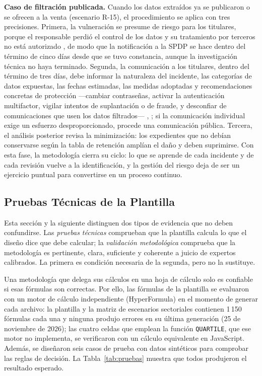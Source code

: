 \textbf{Caso de filtración publicada.} Cuando los datos extraídos ya se publicaron o se ofrecen a la venta (escenario R-15), el procedimiento se aplica con tres precisiones. Primera, la vulneración se presume de riesgo para los titulares, porque el responsable perdió el control de los datos y su tratamiento por terceros no está autorizado \cite[art.~24]{rlopdp2023}, de modo que la notificación a la SPDP se hace dentro del término de cinco días desde que se tuvo constancia, aunque la investigación técnica no haya terminado. Segunda, la comunicación a los titulares, dentro del término de tres días, debe informar la naturaleza del incidente, las categorías de datos expuestas, las fechas estimadas, las medidas adoptadas y recomendaciones concretas de protección ---cambiar contraseñas, activar la autenticación multifactor, vigilar intentos de suplantación o de fraude, y desconfiar de comunicaciones que usen los datos filtrados--- \cite[art.~46]{lopdp2021}, \cite{spdp2026vulneraciones}; si la comunicación individual exige un esfuerzo desproporcionado, procede una comunicación pública. Tercera, el análisis posterior revisa la minimización: los expedientes que no debían conservarse según la tabla de retención amplían el daño y deben suprimirse. Con esta fase, la metodología cierra su ciclo: lo que se aprende de cada incidente y de cada revisión vuelve a la identificación, y la gestión del riesgo deja de ser un ejercicio puntual para convertirse en un proceso continuo.


\subsection{Pruebas Técnicas de la Plantilla}
\label{sec:pruebas_tecnicas}

Esta sección y la siguiente distinguen dos tipos de evidencia que no deben confundirse. Las \textit{pruebas técnicas} comprueban que la plantilla calcula lo que el diseño dice que debe calcular; la \textit{validación metodológica} comprueba que la metodología es pertinente, clara, suficiente y coherente a juicio de expertos calibrados. La primera es condición necesaria de la segunda, pero no la sustituye.


Una metodología que delega sus cálculos en una hoja de cálculo solo es confiable si esas fórmulas son correctas. Por ello, las fórmulas de la plantilla se evaluaron con un motor de cálculo independiente (HyperFormula) en el momento de generar cada archivo: la plantilla y la matriz de escenarios sectoriales contienen 1\,150 fórmulas cada una y ninguna produjo errores en su última generación (25 de noviembre de 2026); las cuatro celdas que emplean la función \texttt{QUARTILE}, que ese motor no implementa, se verificaron con un cálculo equivalente en JavaScript. Además, se diseñaron seis casos de prueba con datos sintéticos para comprobar las reglas de decisión. La Tabla~\ref{tab:pruebas} muestra que todos produjeron el resultado esperado.

